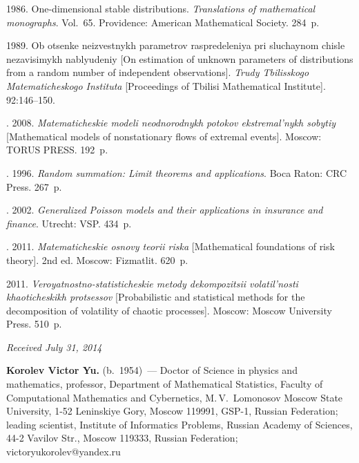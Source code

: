 \begin{multicols}{2}
{{\begin{thebibliography}{99}
 1986. One-dimensional stable distributions.
\textit{Translations of mathematical monographs}. Vol.~65.
Providence:  American Mathematical Society. 284~p.


 1989. Ob otsenke neizvestnykh pa\-ra\-met\-rov raspredeleniya
pri sluchaynom chisle ne\-za\-vi\-si\-mykh nablyudeniy [On estimation of unknown
parameters of distributions from a random number of independent observations].
\textit{Trudy Tbilisskogo Matematicheskogo Instituta}
[Proceedings of Tbilisi Mathematical Institute]. 92:146--150.

. 2008.
\textit{Matema\-ti\-che\-skie modeli neodnorodnykh potokov ekstremal'nykh sobytiy}
[Mathematical models of nonstationary flows of extremal events]. Moscow: TORUS PRESS. 192~p.

. 1996. \textit{Random summation:
Limit theorems and applications}. Boca Raton: CRC Press. 267~p.

. 2002.
\textit{Generalized Poisson models and their applications in insurance and finance}.
Utrecht: VSP. 434~p.

. 2011.
\textit{Matematicheskie osnovy teorii riska}
[Mathematical foundations of risk theory]. 2nd ed. Moscow: Fizmatlit. 620~p.

 2011. \textit{Veroyatnostno-statisticheskie metody dekompozitsii
volatil'nosti khaoticheskikh protsessov} [Probabilistic and statistical methods
for the decomposition of volatility of chaotic processes]. Moscow:
Moscow University Press. 510~p.

\end{thebibliography}
} }


\end{multicols}

\vspace*{-6pt}

\hfill{\small\textit{Received July 31, 2014}}

\vspace*{-12pt}

\Contr

\noindent
\textbf{Korolev Victor Yu.} (b.\ 1954)~---
Doctor of Science in physics and mathematics, professor, Department of
Mathematical Statistics, Faculty of Computational Mathematics and Cybernetics,
M.\,V.~Lomonosov Moscow State University,
 1-52 Leninskiye Gory,  Moscow 119991, GSP-1, Russian Federation;
leading scientist, Institute of Informatics Problems,
Russian Academy of Sciences,
44-2 Vavilov Str., Moscow 119333, Russian Federation;
victoryukorolev@yandex.ru

